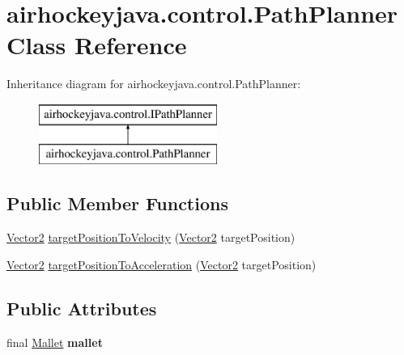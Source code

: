 \hypertarget{classairhockeyjava_1_1control_1_1_path_planner}{}\section{airhockeyjava.\+control.\+Path\+Planner Class Reference}
\label{classairhockeyjava_1_1control_1_1_path_planner}
Inheritance diagram for airhockeyjava.\+control.\+Path\+Planner\+:\begin{figure}[H]
\begin{center}
\leavevmode
\includegraphics[height=2.000000cm]{classairhockeyjava_1_1control_1_1_path_planner}
\end{center}
\end{figure}
\subsection*{Public Member Functions}
\begin{DoxyCompactItemize}
\item 
\hyperlink{classairhockeyjava_1_1util_1_1_vector2}{Vector2} \hyperlink{classairhockeyjava_1_1control_1_1_path_planner_a7c1d62494e9d593266822aa91b52a9be}{target\+Position\+To\+Velocity} (\hyperlink{classairhockeyjava_1_1util_1_1_vector2}{Vector2} target\+Position)
\item 
\hyperlink{classairhockeyjava_1_1util_1_1_vector2}{Vector2} \hyperlink{classairhockeyjava_1_1control_1_1_path_planner_ad87736bc603a34ebc94c34a0f6cd9e5d}{target\+Position\+To\+Acceleration} (\hyperlink{classairhockeyjava_1_1util_1_1_vector2}{Vector2} target\+Position)
\end{DoxyCompactItemize}
\subsection*{Public Attributes}
\begin{DoxyCompactItemize}
\item 
\hypertarget{classairhockeyjava_1_1control_1_1_path_planner_a116a9b5395e6b577cb7731df93b26fde}{}final \hyperlink{classairhockeyjava_1_1physical_1_1_mallet}{Mallet} {\bfseries mallet}\label{classairhockeyjava_1_1control_1_1_path_planner_a116a9b5395e6b577cb7731df93b26fde}

\end{DoxyCompactItemize}

